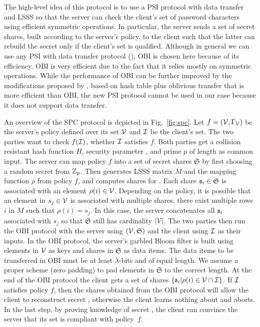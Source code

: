 \noindent
The high-level idea of this protocol is to use a \ac{PSI} protocol with data transfer and \ac{LSSS} so that the server can check the client's set of password characters using efficient symmetric operations.
In particular, the server sends a set of secret shares, built according to the server's policy, to the client such that the latter can rebuild the secret only if the client's set is qualified. 
Although in general we can use any \ac{PSI} with data transfer protocol (\eg \citet{fre04}), \ac{OBI} is chosen here because of its efficiency. 
\ac{OBI} is very efficient due to the fact that it relies mostly on symmetric operations. 
While the performance of \ac{OBI} can be further improved by the modifications proposed by \citet{Pinkas0Z14}, based on hash table plus oblivious transfer that is more efficient than \ac{OBI}, the new \ac{PSI} protocol cannot be used in our case because it does not support data transfer.

An overview of the \ac{SPC} protocol is depicted in Fig.~\ref{fig:spc}. 
Let $f=(\mathcal{V},\Gamma_\mathcal{V})$ be the server's policy defined over its set $\mathcal{V}$ and $\mathcal{I}$ be the client's set. 
The two parties want to check $f(\mathcal{I})$, \ie whether $\mathcal{I}$ satisfies $f$. 
Both parties get a collision resistant hash function $H$, security parameter \secpar, and prime $p$ of length \secpar as common input. 
The server can map policy $f$ into a set of secret shares $\mathfrak{S}$ by first choosing a random secret \secret from $\mathbb{Z}_p$.
Then \Server generates \ac{LSSS} matrix $M$ and the mapping function $\rho$ from policy $f$, and computes shares for \secret. 
Each share $\mathfrak{s}_i \in \mathfrak{S}$ is associated with an element $\rho(i)\in \mathcal{V}$. 
Depending on the policy, it is possible that an element in $s_j\in\mathcal{V}$ is associated with multiple shares, \ie there exist multiple rows $i$ in $M$ such that $\rho(i)=s_j$. 
In this case, the server concatenates all $\mathfrak{s}_i$ associated with $s_j$ so that $\mathfrak{S}$ still has cardinality $|\mathcal{V}|$. 
The two parties then run the \ac{OBI} protocol with the server using $(\mathcal{V}, \mathfrak{S})$ and the client using $\mathcal{I}$ as their inputs. 
In the \ac{OBI} protocol, the server's garbled Bloom filter is built using elements in $\mathcal{V}$ as keys and shares in $\mathfrak{S}$ as data items.
The data items to be transferred in \ac{OBI} must be at least $\lambda$-bits and of equal length. 
We assume a proper scheme (\eg zero padding) to pad elements in $\mathfrak{S}$ to the correct length.
At the end of the \ac{OBI} protocol the client gets a set of shares $\{\mathfrak{s}_i|\rho(i)\in \mathcal{V}\cap \mathcal{I}\}$. 
If $\mathcal{I}$ satisfies policy $f$, then the shares obtained from the \ac{OBI} protocol will allow the client to reconstruct secret \secret, otherwise the client learns nothing about \secret and aborts. 
In the last step, by proving knowledge of secret \secret, the client can convince the server that its set is compliant with policy~$f$.


